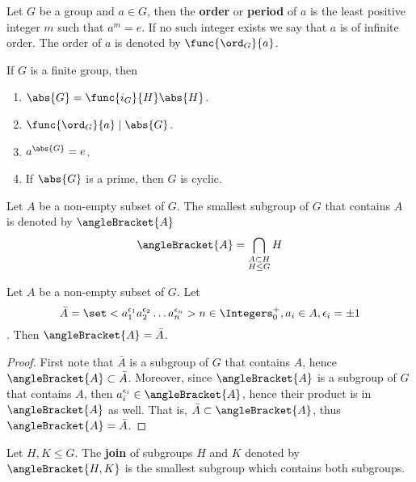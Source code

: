 \begin{definition}
    Let \(G\) be a group and \(a \in G\), then the \textbf{order} or \textbf{period} of \(a\) is the least positive integer \(m\) such that \(a^m = e\). If no such integer exists we say that \(a\) is of infinite order. The order of \(a\) is denoted by \(\func{\ord_G}{a}\).
\end{definition}

\begin{corollary}
    If \(G\) is a finite group, then 
    \begin{enumerate}
        \item \(\abs{G} = \func{i_G}{H} \abs{H}\).
        \item \(\func{\ord_G}{a} \mid \abs{G}\).
        \item \(a^{\abs{G}} = e\).
        \item If \(\abs{G}\) is a prime, then \(G\) is cyclic.
    \end{enumerate}
\end{corollary}

Let \(A\) be a non-empty subset of \(G\). The smallest subgroup of \(G\) that contains \(A\) is denoted by \(\angleBracket{A}\) 
\begin{equation*}
    \angleBracket{A} = \bigcap_{\substack{A \subset H\\ H \leq G}} H
\end{equation*}

\begin{lemma}
    Let \(A\) be a non-empty subset of \(G\). Let 
    \begin{equation*}
        \bar{A} = \set<a_1^{\epsilon_1}a_2^{\epsilon_2}\dots a_n^{\epsilon_n}>{n \in \Integers^+_0, a_i \in A, \epsilon_i = \pm 1}
    \end{equation*}
    . Then \(\angleBracket{A} = \bar{A}\).
\end{lemma}

\begin{proof}
    First note that \(\bar{A}\) is a subgroup of \(G\) that contains \(A\), hence \(\angleBracket{A} \subset \bar{A}\). Moreover, since \(\angleBracket{A}\) is a subgroup of \(G\) that contains \(A\), then \(a_i^{\epsilon_i} \in \angleBracket{A}\), hence their product is in \(\angleBracket{A}\) as well. That is, \(\bar{A} \subset \angleBracket{A}\), thus \(\angleBracket{A} = \bar{A}\).
\end{proof}

\begin{definition}
    Let \(H,K \leq G\). The \textbf{join} of subgroups \(H\) and \(K\) denoted by \(\angleBracket{H,K}\) is the smallest subgroup which contains both subgroups.
\end{definition}

